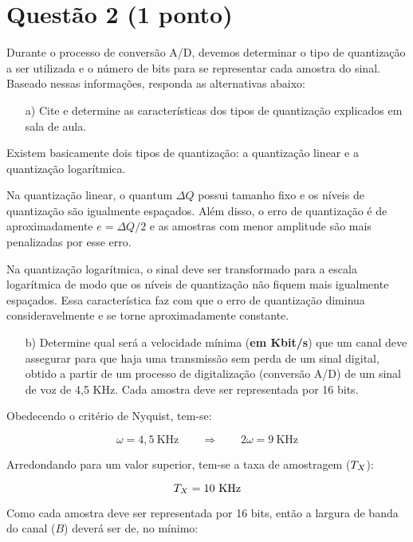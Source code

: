 \documentclass[a4paper,11pt]{article}
\begin{document}
\pagebreak

\section*{Questão 2 (1 ponto)}
Durante o processo de conversão A/D, devemos determinar o tipo de quantização a
ser utilizada e o número de bits para se representar cada amostra do sinal.
Baseado nessas informações, responda as alternativas abaixo:

\begin{itemize}
    \item [a)] Cite e determine as características dos tipos de quantização
explicados em sala de aula.
\end{itemize}

Existem basicamente dois tipos de quantização: a quantização linear e a
quantização logarítmica.

Na quantização linear, o quantum $\Delta Q$ possui tamanho fixo e os níveis
de quantização são igualmente espaçados. Além disso, o erro de quantização é de
aproximadamente $e = \Delta Q/2$ e as amostras com menor amplitude são mais
penalizadas por esse erro. 

Na quantização logarítmica, o sinal deve ser transformado para a escala
logarítmica de modo que os níveis de quantização não fiquem mais igualmente
espaçados. Essa característica faz com que o erro de quantização diminua
consideravelmente e se torne aproximadamente constante.

\begin{itemize}
    \item [b)] Determine qual será a velocidade mínima ({\bf em Kbit/s}) que um
canal deve assegurar para que haja uma transmissão sem perda de um sinal
digital, obtido a partir de um processo de digitalização (conversão A/D) de um
sinal de voz de 4,5 KHz. Cada amostra deve ser representada por 16 bits.
\end{itemize}

Obedecendo o critério de Nyquist, tem-se:

\[
\omega = 4,5\ \text{KHz}\qquad \Longrightarrow \qquad 2\omega = 9\ \text{KHz}
\]

Arredondando para um valor superior, tem-se a taxa de amostragem ($T_{\tiny
X}$):

\[
T_{\tiny X} = 10\ \text{KHz}
\]

Como cada amostra deve ser representada por 16 bits, então a largura de banda do
canal ($B$) deverá ser de, no mínimo:
\end{document}
